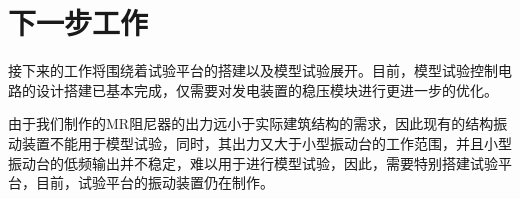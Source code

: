\section{下一步工作}

接下来的工作将围绕着试验平台的搭建以及模型试验展开。目前，模型试验控制电路的设计搭建已基本完成，仅需要对发电装置的稳压模块进行更进一步的优化。

由于我们制作的MR阻尼器的出力远小于实际建筑结构的需求，因此现有的结构振动装置不能用于模型试验，同时，其出力又大于小型振动台的工作范围，并且小型振动台的低频输出并不稳定，难以用于进行模型试验，因此，需要特别搭建试验平台，目前，试验平台的振动装置仍在制作。
